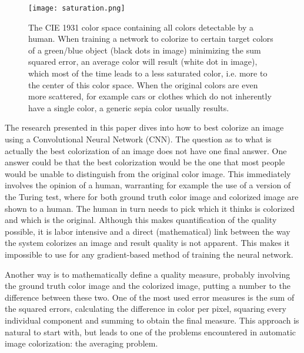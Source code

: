 \begin{wrapfigure}{R}{0.37\textwidth}
	\vspace{-35pt}
	\begin{center}
		\texttt{[image: saturation.png]}
	\end{center}
	\caption{\label{fig:colorspacesaturation} The CIE 1931 color space containing all colors detectable by a human. When training a network to colorize to certain target colors of a green/blue object (black dots in image) minimizing the sum squared error, an average color will result (white dot in image), which most of the time leads to a less saturated color, i.e. more to the center of this color space. When the original colors are even more scattered, for example cars or clothes which do not inherently have a single color, a generic sepia color usually results.}
	\vspace{-5pt}
\end{wrapfigure}

The research presented in this paper dives into how to best colorize an image using a Convolutional Neural Network (CNN). The question as to what is actually the best colorization of an image does not have one final answer. 
One answer could be that the best colorization would be the one that most people would be unable to distinguish from the original color image. This immediately involves the opinion of a human, warranting for example the use of a version of the Turing test, where for both ground truth color image and colorized image are shown to a human. The human in turn needs to pick which it thinks is colorized and which is the original. 
Although this makes quantification of the quality possible, it is labor intensive and a direct (mathematical) link between the way the system colorizes an image and result quality is not apparent. This makes it impossible to use for any gradient-based method of training the neural network. 

Another way is to mathematically define a quality measure, probably involving the ground truth color image and the colorized image, putting a number to the difference between these two. 
One of the most used error measures is the sum of the squared errors, calculating the difference in color per pixel, squaring every individual component and summing to obtain the final measure. 
This approach is natural to start with, but leads to one of the problems encountered in automatic image colorization: the averaging problem.

